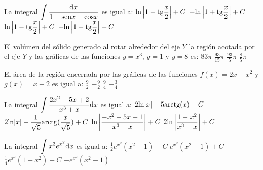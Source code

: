 \begin{Pregunta}{3}{3}
La integral ${\displaystyle\int\frac{{\rm d}x}{1-{\rm sen}x+{\rm cos}x}}$ es igual a:
\Opcion                                                                              
${\displaystyle{\rm ln}\left|1+{\rm tg}\frac{x}{2}\right|+C}$                        
\Opcion                                                                              
${\displaystyle-{\rm ln}\left|1+{\rm tg}\frac{x}{2}\right|+C}$                       
\Opcion                                                                              
${\displaystyle{\rm ln}\left|1-{\rm tg}\frac{x}{2}\right|+C}$                        
\Opcion                                                                              
${\displaystyle-{\rm ln}\left|1-{\rm tg}\frac{x}{2}\right|+C}$                       
\end{Pregunta}

\begin{Pregunta}{4}{2}
El vol\'umen del s\'olido generado al rotar alrededor del eje $Y$ la regi\'on acotada por el eje $Y$ y las gr\'aficas de las funciones ${\displaystyle y=x^3}$, ${\displaystyle y=1}$ y ${\displaystyle y=8}$ es:
\Opcion
${\displaystyle 83\pi}$
\Opcion
${\displaystyle\frac{93}{15}\pi}$
\Opcion
${\displaystyle\frac{93}{5}\pi}$
\Opcion
${\displaystyle\frac{8}{5}\pi}$
\end{Pregunta}


\begin{Pregunta}{3}{0}
El \'area de la regi\'on encerrada por las gr\'aficas de las funciones ${\displaystyle f(x)=2x-x^2}$ y ${\displaystyle g(x)=x-2}$ es igual a:
\Opcion
${\displaystyle\frac{9}{2}}$
\Opcion
${\displaystyle-\frac{9}{2}}$
\Opcion
${\displaystyle\frac{9}{4}}$
\Opcion
${\displaystyle-\frac{3}{4}}$
\end{Pregunta}

\begin{Pregunta}{4}{0}
La integral ${\displaystyle\int\frac{2x^2-5x+2}{x^3+x}{\rm d}x}$ es igual a:
\Opcion
${\displaystyle2{\rm ln}|x|-5{\rm arctg}(x)+C}$
\Opcion
${\displaystyle2{\rm ln}|x|-\frac{1}{\sqrt{5}}{\rm arctg}(\frac{x}{\sqrt{5}})+C}$
\Opcion
${\displaystyle{\rm ln}\left|\frac{-x^2-5x+1}{x^3+x}\right|+C}$
\Opcion
${\displaystyle2{\rm ln}\left|\frac{1-x^2}{x^3+x}\right|+C}$
\end{Pregunta}

\begin{Pregunta}{3}{0}
La integral ${\displaystyle\int x^3e^{x^2}{\rm d}x}$ es igual a:
\Opcion
${\displaystyle\frac{1}{2}e^{x^2}\left(x^2-1\right)+C}$
\Opcion
${\displaystyle e^{x^2}\left(x^2-1\right)+C}$
\Opcion
${\displaystyle\frac{1}{4}e^{x^2}\left(1-x^2\right)+C}$
\Opcion
${\displaystyle-e^{x^2}\left(x^2-1\right)}$
\end{Pregunta}
